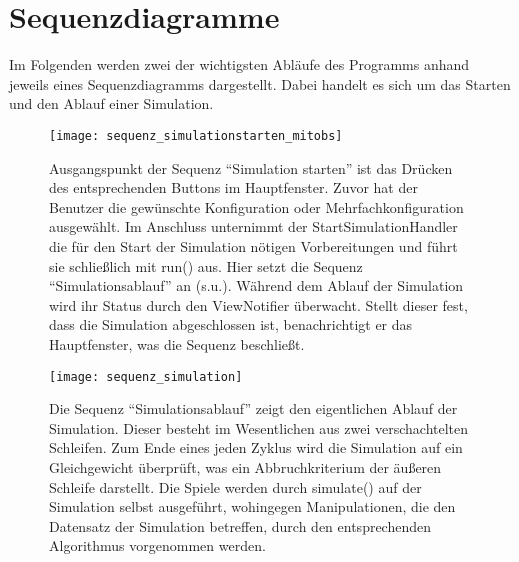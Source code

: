 \section{Sequenzdiagramme}

Im Folgenden werden zwei der wichtigsten Abläufe des Programms anhand jeweils eines Sequenzdiagramms dargestellt.
Dabei handelt es sich um das Starten und den Ablauf einer Simulation.

\begin{figure}[htbp]
{\centering 
\texttt{[image: sequenz\_simulationstarten\_mitobs]}}
\bigskip


Ausgangspunkt der Sequenz "`Simulation starten"' ist das Drücken des entsprechenden Buttons im Hauptfenster. Zuvor hat der Benutzer die gewünschte Konfiguration oder Mehrfachkonfiguration ausgewählt.
Im Anschluss unternimmt der StartSimulationHandler die für den Start der Simulation nötigen Vorbereitungen und führt sie schließlich mit run() aus.
Hier setzt die Sequenz "`Simulationsablauf"' an (s.u.).
Während dem Ablauf der Simulation wird ihr Status durch den ViewNotifier überwacht. Stellt dieser fest, dass die Simulation abgeschlossen ist, benachrichtigt er das Hauptfenster, was die Sequenz beschließt.
\end{figure}

\begin{figure}[htbp]
{\centering 
\texttt{[image: sequenz\_simulation]}}
\bigskip


Die Sequenz "`Simulationsablauf"' zeigt den eigentlichen Ablauf der Simulation. Dieser besteht im Wesentlichen aus zwei verschachtelten Schleifen. Zum Ende eines jeden Zyklus wird die Simulation auf ein Gleichgewicht überprüft, was ein Abbruchkriterium der äußeren Schleife darstellt.
Die Spiele werden durch simulate() auf der Simulation selbst ausgeführt, wohingegen Manipulationen, die den Datensatz der Simulation betreffen, durch den entsprechenden Algorithmus vorgenommen werden.

\end{figure}




